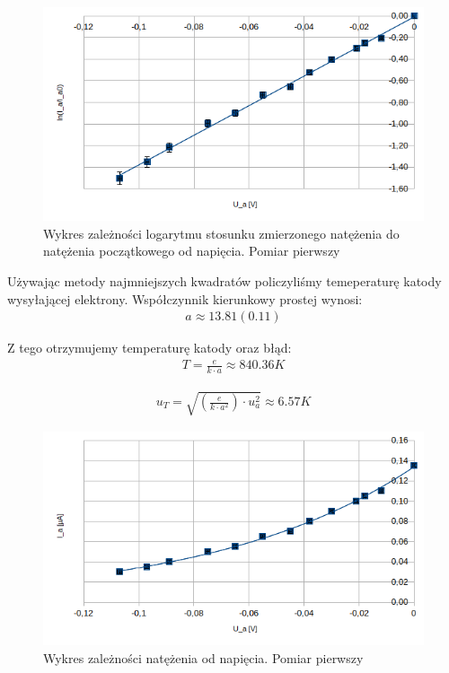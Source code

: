 \documentclass[a4paper]{article}
\begin{document}
\begin{figure}[h!]
	\includegraphics[scale=1]{T1_ln_U}
	\centering
	\caption{Wykres zależności logarytmu stosunku zmierzonego natężenia do natężenia początkowego od napięcia. Pomiar pierwszy}
\end{figure}

Używając metody najmniejszych kwadratów policzyliśmy temeperaturę katody wysyłającej elektrony. Współczynnik kierunkowy prostej wynosi:
\begin{align*}
a \approx 13.81 (0.11)
\end{align*}

Z tego otrzymujemy temperaturę katody oraz błąd:
\begin{align*}
T = \frac{e}{k \cdot a} \approx 840.36 K
\end{align*}

\begin{align*}
u_{T} = \sqrt{(\frac{e}{k \cdot a^2}) \cdot u_{a}^2} \approx 6.57 K
\end{align*}


\begin{figure}[h!]
	\includegraphics[scale=1]{T1_Ia_U}
	\centering
	\caption{Wykres zależności natężenia od napięcia. Pomiar pierwszy}
\end{figure}
\end{document}
